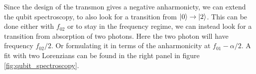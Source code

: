 Since the design of the transmon gives a negative anharmonicty, we can extend the qubit spectroscopy, to also look for a transition from $\ket{0}\to \ket{2}$. This can be done either with $f_{02}$ or to stay in the frequency regime, we can instead look for a transition from absorption of two photons. Here the two photon will have frequency $f_{02} / 2$. Or formulating it in terms of the anharmonicity at $f_{01} - \alpha / 2$. A fit with two Lorenzians can be found in the right panel in figure \ref{fig:qubit_spectroscopy}. 
